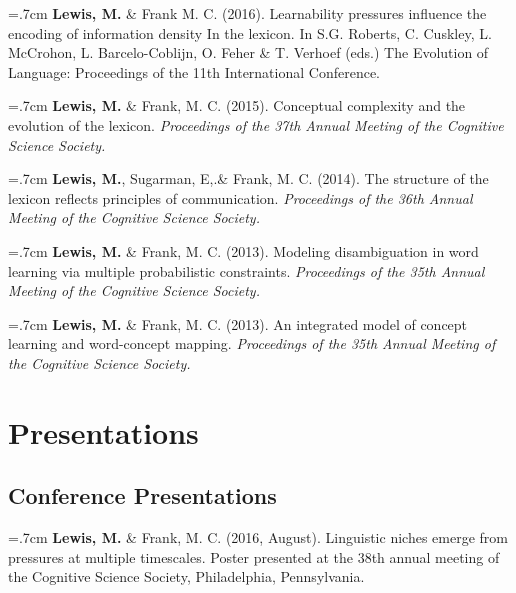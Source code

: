 \documentclass[letterpaper]{article}
\begin{document}
  \hangindent=.7cm {\bf Lewis, M.} \& Frank M. C. (2016). Learnability pressures influence the encoding of information density In the lexicon. In S.G. Roberts, C. Cuskley, L. McCrohon, L. Barcelo-Coblijn, O. Feher \& T. Verhoef (eds.) The Evolution of Language: Proceedings of the 11th International Conference.


 \hangindent=.7cm {\bf Lewis, M.} \& Frank, M. C. (2015). Conceptual complexity and the evolution of the lexicon. { \it Proceedings of the 37th Annual Meeting of the Cognitive Science Society.}
 
 \hangindent=.7cm {\bf Lewis, M.}, Sugarman, E,.\& Frank, M. C. (2014). The structure of the lexicon reflects principles of communication. { \it Proceedings of the 36th Annual Meeting of the Cognitive Science Society.}
  
  
 \hangindent=.7cm {\bf Lewis, M.} \& Frank, M. C. (2013). Modeling disambiguation in word learning via multiple probabilistic constraints. { \it Proceedings of the 35th Annual Meeting of the Cognitive Science Society.}

 \hangindent=.7cm {\bf Lewis, M.} \& Frank, M. C. (2013). An integrated model of concept learning and word-concept mapping.{ \it Proceedings of the 35th Annual Meeting of the Cognitive Science Society.}
 
 \singlespacing
 
\section*{Presentations}
\onehalfspacing

\subsection*{Conference Presentations}

\hangindent=.7cm {\bf Lewis, M.} \& Frank, M. C. (2016, August).  Linguistic niches emerge from pressures at multiple timescales. Poster presented at the 38th annual meeting of the Cognitive Science Society, Philadelphia, Pennsylvania.
\end{document}
